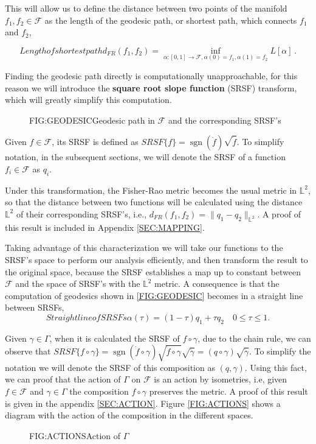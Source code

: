 This will allow us to define the distance between two points of the
manifold $f_1, f_2 \in \mathcal{F}$ as the length of the geodesic path, or shortest
path, which connects $f_1$ and $f_2$,

\begin{equation}[]{Length of shortest path}
d_{F R}\left(f_{1}, f_{2}\right)=\inf _{\alpha :[0,1]
\rightarrow \mathcal{F}, \alpha(0)=f_{1}, \alpha(1)=f_{2}} L[\alpha] \, .
\end{equation}

Finding the geodesic path directly is computationally unapproachable,
for this reason we will introduce the \textbf{square root slope function} (SRSF)
transform, which will greatly simplify this computation.

\begin{figure}[Geodesic path in $\mathcal{F}$]{FIG:GEODESIC}{Geodesic path in $\mathcal{F}$ and the corresponding SRSF's}
   \quad
\end{figure}

Given $f \in \mathcal{F}$, its SRSF is defined as
$SRSF\{f\} = \operatorname{sgn}{(\dot f)} \sqrt{\dot f}$. To simplify notation, in the
subsequent sections, we will denote the SRSF of a function
$f_i \in \mathcal{F}$ as $q_i$.

Under this transformation, the Fisher-Rao metric becomes the usual metric
in $\mathbb{L}^2$, so that the distance between two functions will be
calculated using the distance $\mathbb{L}^2$ of their corresponding
SRSF's, i.e.,  $d_{FR}(f_1, f_2) = \| q_1 - q_2 \|_{\mathbb{L}^2}$. A proof of
this result is included in Appendix \ref{SEC:MAPPING}.

Taking advantage of this characterization we will take our functions to the
SRSF's space to perform our analysis efficiently, and then transform the result
to the original space, because the SRSF establishes a map up to constant between
$\mathcal{F}$ and the space of SRSF's with the $\mathbb{L}^2$ metric.
A consequence is that the computation of geodesics shown in
\ref{FIG:GEODESIC} becomes in a straight line
between SRSFs, 
\begin{equation}[]{Straight line of SRSFs}
\alpha(\tau) = (1 - \tau)q_1 + \tau q_2 \quad 0 \le \tau \le 1.
\end{equation}

Given $\gamma \in \Gamma$, when it is calculated the SRSF of $f \circ \gamma$,
due to the chain rule, we can observe that
$SRSF\{f \circ \gamma\} = \operatorname{sgn}(\dot{f} \circ \gamma) \sqrt{\dot f \circ \gamma}
\sqrt{\dot \gamma} = (q \circ \gamma) \sqrt{\dot \gamma}$. To simplify the
notation we  will denote the SRSF of this composition as $(q, \gamma)$.
Using this fact, we can proof that the action of $\Gamma$ on $\mathscr{F}$ is an
action by isometries, i.e, given $f  \in \mathscr{F}$ and $\gamma \in \Gamma$
the composition $f \circ \gamma$ preserves the metric.
A proof of this result is given in the appendix \ref{SEC:ACTION}.
Figure \ref{FIG:ACTIONS} shows a diagram with the action of the composition
in the different spaces.

\begin{figure}[Action of $\Gamma$]{FIG:ACTIONS}{Action of $\Gamma$}


\end{figure}
